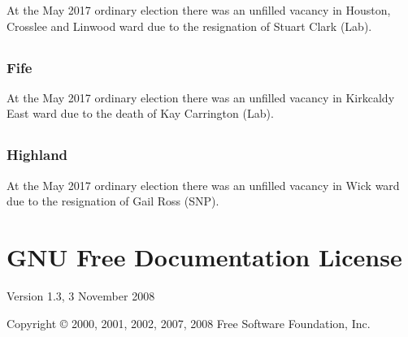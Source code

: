 \documentclass[a4paper,openany]{book}
\begin{document}
\begin{resultsiii}
At the May 2017 ordinary election there was an unfilled vacancy in Houston, Crosslee and Linwood ward due to the resignation of Stuart Clark (Lab).

\section[Forth Councils]{}

\subsection*{Fife}

At the May 2017 ordinary election there was an unfilled vacancy in Kirkcaldy East ward due to the death of Kay Carrington (Lab).

\section[Highland Councils]{}

\subsection*{Highland}

At the May 2017 ordinary election there was an unfilled vacancy in Wick ward due to the resignation of Gail Ross (SNP).

\end{resultsiii}

\clearpage
{}
{\scriptsize%
\frenchspacing\printindex}
\thispagestyle{plain}

\chapter*{{GNU Free Documentation License}}
\pagestyle{plain}

 Version 1.3, 3 November 2008


 Copyright \copyright{} 2000, 2001, 2002, 2007, 2008 Free Software Foundation, Inc.
 
\end{document}
